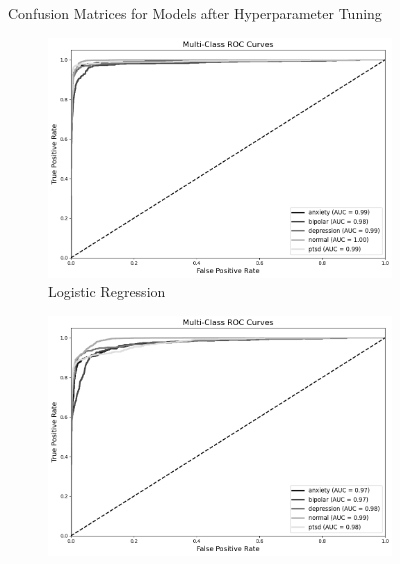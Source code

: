 \begin{figure}[H]
\begin{subfigure}[b]{0.49\textwidth}
    \end{subfigure}
    \label{fig:hp_lr_comparison}
    \vspace{-0.25cm}
    \caption{Confusion Matrices for Models after Hyperparameter Tuning}
\end{figure}

\pagebreak

\begin{figure}[H]
    \centering
    \begin{subfigure}[b]{0.49\textwidth}
        \centering
        \includegraphics[width=\textwidth]{Images/LR ROC.png}
        \caption{Logistic Regression}
        \label{LRROC}  %
    \end{subfigure}
    \hfill
    \vspace{0.75cm}
    \begin{subfigure}[b]{0.49\textwidth}
        \centering
        \includegraphics[width=\textwidth]{Images/NB ROC.png}

\end{subfigure}
\end{figure}
